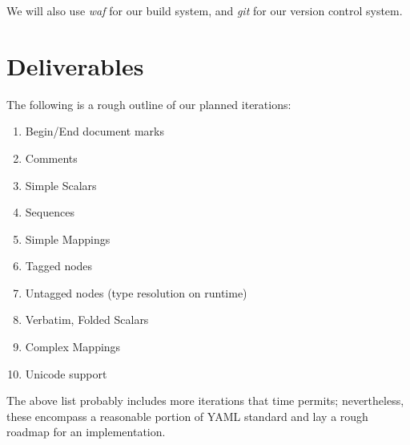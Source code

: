\documentclass{article}
\begin{document}
We will also use \emph{waf} for our build system, and \emph{git} for our version control system.

\section{Deliverables}

The following is a rough outline of our planned iterations:

\begin{enumerate}
  \item Begin/End document marks
  \item Comments
  \item Simple Scalars
  \item Sequences
  \item Simple Mappings
  \item Tagged nodes
  \item Untagged nodes (type resolution on runtime)
  \item Verbatim, Folded Scalars
  \item Complex Mappings
  \item Unicode support
\end{enumerate}

The above list probably includes more iterations that time permits;  nevertheless, these encompass a reasonable portion of YAML standard and lay a rough roadmap for an implementation.
\end{document}
